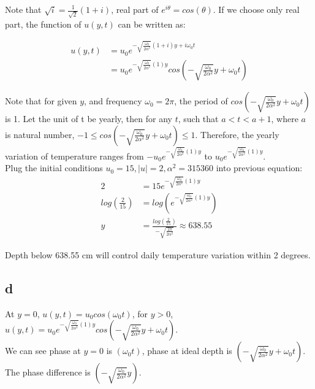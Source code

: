 \documentclass[11pt,letterpaper]{article}
\begin{document}
\noindent Note that $\sqrt{i} = \frac{1}{\sqrt{2}} (1 + i)$, real part of $e^{i \theta} = cos(\theta)$. If we choose only real part, the function of $u(y,t)$ can be written as:

\begin{align*}
u(y, t) &= u_0 e^{- \sqrt{\frac{\omega_0}{2 \alpha^2}}(1 + i)y + i \omega_0 t} \\
&= u_0 e^{- \sqrt{\frac{\omega_0}{2 \alpha^2}}(1)y} cos(- \sqrt{\frac{\omega_0}{2 \alpha^2}} y + \omega_0 t)
\end{align*}

\noindent Note that for given $y$, and frequency $\omega_0 = 2 \pi$, the period of $cos(- \sqrt{\frac{\omega_0}{2 \alpha^2}} y + \omega_0 t)$ is 1. Let the unit of t be yearly, then for any $t$, such that $a < t < a+1$, where $a$ is natural number, $-1 \leq cos(- \sqrt{\frac{\omega_0}{2 \alpha^2}} y + \omega_0 t) \leq 1$. Therefore, the yearly variation of temperature ranges from $- u_0 e^{- \sqrt{\frac{\omega_0}{2 \alpha^2}}(1)y}$ to $u_0 e^{- \sqrt{\frac{\omega_0}{2 \alpha^2}}(1)y} $. \\

\noindent Plug the initial conditions $u_0=15, |u| = 2, \alpha^2 = 315360$ into previous equation:
\begin{align*}
2 &= 15 e^{- \sqrt{\frac{\omega_0}{2 \alpha^2}}(1)y} \\
log(\frac{2}{15}) &= log(e^{- \sqrt{\frac{\omega_0}{2 \alpha^2}}(1)y} ) \\
y &= \frac{log(\frac{2}{15})}{-\sqrt{\frac{2 \pi}{2 \alpha^2}}} \approx 638.55
\end{align*}

\noindent Depth below 638.55 cm will control daily temperature variation within 2 degrees. \\

\subsection*{d}
\noindent At $y = 0$, $u(y, t) = u_0 cos(\omega_0 t)$, for $y > 0$, $u(y, t) = u_0 e^{- \sqrt{\frac{\omega_0}{2 \alpha^2}}(1)y} cos(- \sqrt{\frac{\omega_0}{2 \alpha^2}} y + \omega_0 t)$. \\

\noindent We can see phase at $y = 0$ is $(\omega_0 t)$, phase at ideal depth is $(- \sqrt{\frac{\omega_0}{2 \alpha^2}}y + \omega_0 t)$. The phase difference is $(- \sqrt{\frac{\omega_0}{2 \alpha^2}} y)$. \\
\end{document}
